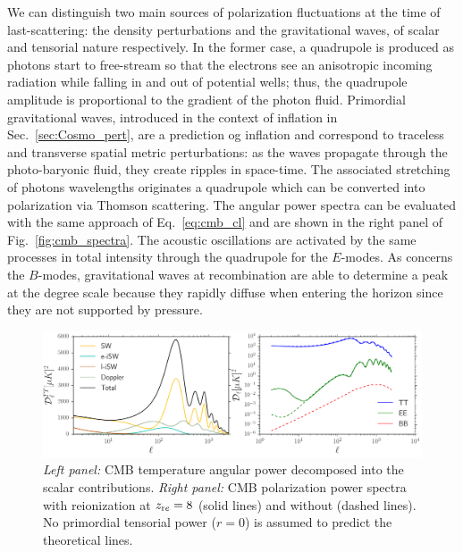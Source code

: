 We can distinguish two main sources of polarization fluctuations at the time of last-scattering: the density perturbations and the gravitational waves, of scalar and tensorial nature respectively. In the former case, a quadrupole is produced as photons start
to free-stream so that the electrons see an anisotropic incoming radiation while falling in and out of potential wells; thus, the quadrupole amplitude is proportional to the gradient of the photon fluid. Primordial gravitational waves, introduced in the context of inflation in Sec.~\eqref{sec:Cosmo_pert}, are a prediction og inflation and correspond to traceless and transverse spatial metric perturbations: as the waves propagate through the photo-baryonic fluid, they create ripples in space-time. The associated stretching of photons wavelengths originates a quadrupole which can be converted into polarization via Thomson scattering. The 
angular power spectra can be evaluated with the same approach of Eq.~\eqref{eq:cmb_cl} and are shown in the right panel of Fig.~\eqref{fig:cmb_spectra}. The acoustic oscillations are activated by the same processes in total intensity through the quadrupole for the $E$-modes. As concerns the $B$-modes, gravitational waves at recombination are able to determine a peak at the degree scale because they rapidly diffuse when entering the horizon since they are not supported by pressure.

\begin{figure} %
\centering %
\includegraphics[width=\textwidth]{Chapter1/Images/cmb}
\caption{\emph{Left panel:} \gls{CMB} temperature angular power decomposed into the scalar contributions. \emph{Right panel:} \gls{CMB} polarization power spectra with reionization at $z_{\rm re}= 8$ (solid lines) and without (dashed lines). No primordial tensorial power ($r=0$) is assumed to predict the theoretical lines.\label{fig:cmb_spectra}}
\end{figure}


